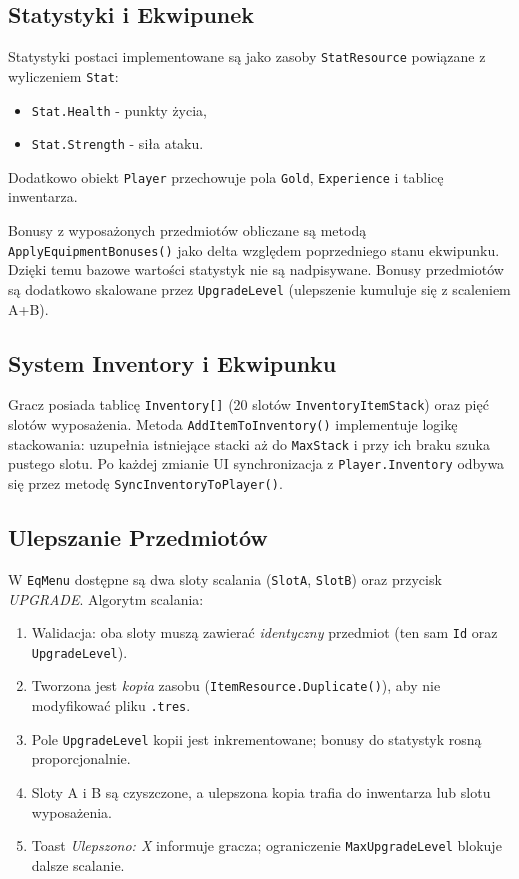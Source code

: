 \subsection{Statystyki i Ekwipunek}

Statystyki postaci implementowane są jako zasoby \texttt{StatResource} powiązane z wyliczeniem \texttt{Stat}:
\begin{itemize}
    \item \texttt{Stat.Health} - punkty życia,
    \item \texttt{Stat.Strength} - siła ataku.
\end{itemize}
Dodatkowo obiekt \texttt{Player} przechowuje pola \texttt{Gold}, \texttt{Experience} i tablicę inwentarza.

Bonusy z wyposażonych przedmiotów obliczane są metodą \texttt{ApplyEquipmentBonuses()} jako delta względem poprzedniego stanu ekwipunku. Dzięki temu bazowe wartości statystyk nie są nadpisywane. Bonusy przedmiotów są dodatkowo skalowane przez \texttt{UpgradeLevel} (ulepszenie kumuluje się z scaleniem A+B).

\subsection{System Inventory i Ekwipunku}

Gracz posiada tablicę \texttt{Inventory[]} (20 slotów \texttt{InventoryItemStack}) oraz pięć slotów wyposażenia. Metoda \texttt{AddItemToInventory()} implementuje logikę stackowania: uzupełnia istniejące stacki aż do \texttt{MaxStack} i przy ich braku szuka pustego slotu. Po każdej zmianie UI synchronizacja z \texttt{Player.Inventory} odbywa się przez metodę \texttt{SyncInventoryToPlayer()}.

\subsection{Ulepszanie Przedmiotów}

W \texttt{EqMenu} dostępne są dwa sloty scalania (\texttt{SlotA}, \texttt{SlotB}) oraz przycisk \textit{UPGRADE}. Algorytm scalania:
\begin{enumerate}
    \item Walidacja: oba sloty muszą zawierać \emph{identyczny} przedmiot (ten sam \texttt{Id} oraz \texttt{UpgradeLevel}).
    \item Tworzona jest \emph{kopia} zasobu (\texttt{ItemResource.Duplicate()}), aby nie modyfikować pliku \texttt{.tres}.
    \item Pole \texttt{UpgradeLevel} kopii jest inkrementowane; bonusy do statystyk rosną proporcjonalnie.
    \item Sloty A i B są czyszczone, a ulepszona kopia trafia do inwentarza lub slotu wyposażenia.
    \item Toast \emph{Ulepszono: X} informuje gracza; ograniczenie \texttt{MaxUpgradeLevel} blokuje dalsze scalanie.
\end{enumerate}

